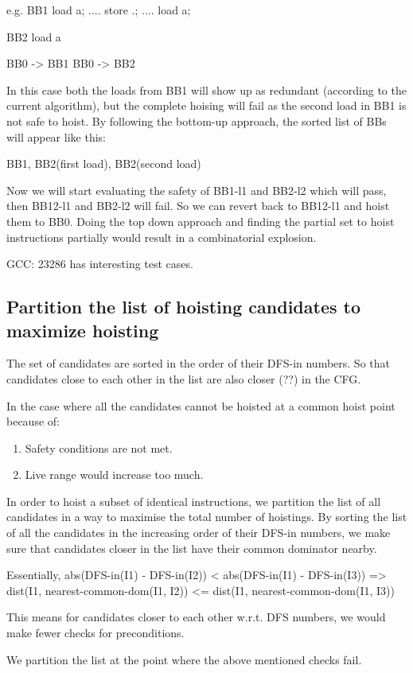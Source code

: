 \begin{section}
e.g.
BB1
load a;
....
store .;
....
load a;


BB2
load a

BB0 -> BB1
BB0 -> BB2

In this case both the loads from BB1 will show up as redundant
(according to the current algorithm), but the complete hoising will
fail as the second load in BB1 is not safe to hoist. By following the
bottom-up approach, the sorted list of BBs will appear like this:

{ BB1, BB2(first load), BB2(second load) }

Now we will start evaluating the safety of BB1-l1 and BB2-l2 which
will pass, then BB12-l1 and BB2-l2 will fail.  So we can revert back
to BB12-l1 and hoist them to BB0. Doing the top down approach and
finding the partial set to hoist instructions partially would result
in a combinatorial explosion.

GCC: 23286 has interesting test cases.

\section{Partition the list of hoisting candidates to maximize hoisting}
The set of candidates are sorted in the order of their DFS-in
numbers. So that candidates close to each other in the list are also
closer (??) in the CFG.

In the case where all the candidates cannot be hoisted at a common
hoist point because of:
\begin{enumerate}
\item Safety conditions are not met.
\item Live range would increase too much.
\end{enumerate}

In order to hoist a subset of identical instructions, we partition the
list of all candidates in a way to maximise the total number of
hoistings.  By sorting the list of all the candidates in the
increasing order of their DFS-in numbers, we make sure that candidates
closer in the list have their common dominator nearby.

Essentially,
abs(DFS-in(I1) - DFS-in(I2)) < abs(DFS-in(I1) - DFS-in(I3))
=> dist(I1, nearest-common-dom(I1, I2)) <= dist(I1, nearest-common-dom(I1, I3))

This means for candidates closer to each other w.r.t. DFS numbers, we
would make fewer checks for preconditions.

We partition the list at the point where the above mentioned checks fail.


\end{section}
